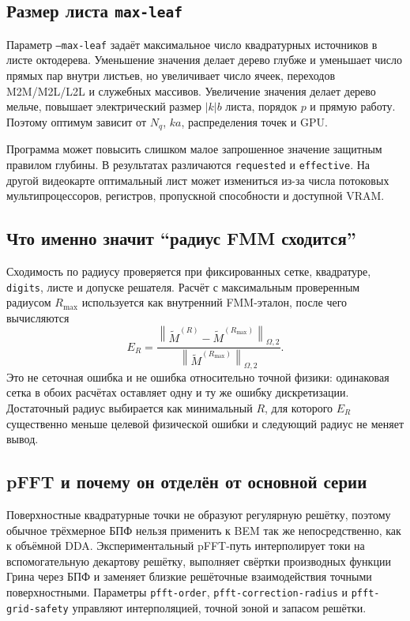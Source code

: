 \documentclass[12pt,a4paper]{article}
\newcommand{\norm}[1]{\left\lVert #1\right\rVert}
\begin{document}
\subsection{Размер листа \texttt{max-leaf}}

Параметр \texttt{--max-leaf} задаёт максимальное число квадратурных источников
в листе октодерева. Уменьшение значения делает дерево глубже и уменьшает число
прямых пар внутри листьев, но увеличивает число ячеек, переходов M2M/M2L/L2L и
служебных массивов. Увеличение значения делает дерево мельче, повышает
электрический размер $|k|b$ листа, порядок $p$ и прямую работу. Поэтому
оптимум зависит от $N_q$, $ka$, распределения точек и GPU.

Программа может повысить слишком малое запрошенное значение защитным правилом
глубины. В результатах различаются \texttt{requested} и \texttt{effective}.
На другой видеокарте оптимальный лист может измениться из-за числа потоковых
мультипроцессоров, регистров, пропускной способности и доступной VRAM.

\subsection{Что именно значит ``радиус FMM сходится''}

Сходимость по радиусу проверяется при фиксированных сетке, квадратуре,
\texttt{digits}, листе и допуске решателя. Расчёт с максимальным проверенным
радиусом $R_{\max}$ используется как внутренний FMM-эталон, после чего
вычисляются
\begin{equation}
  E_R=\frac{\norm{\widetilde M^{(R)}-
  \widetilde M^{(R_{\max})}}_{\Omega,2}}
  {\norm{\widetilde M^{(R_{\max})}}_{\Omega,2}}.
\end{equation}
Это не сеточная ошибка и не ошибка относительно точной физики: одинаковая
сетка в обоих расчётах оставляет одну и ту же ошибку дискретизации. Достаточный
радиус выбирается как минимальный $R$, для которого $E_R$ существенно меньше
целевой физической ошибки и следующий радиус не меняет вывод.

\subsection{pFFT и почему он отделён от основной серии}

Поверхностные квадратурные точки не образуют регулярную решётку, поэтому
обычное трёхмерное БПФ нельзя применить к BEM так же непосредственно, как к
объёмной DDA. Экспериментальный pFFT-путь интерполирует токи на вспомогательную
декартову решётку, выполняет свёртки производных функции Грина через БПФ и
заменяет близкие решёточные взаимодействия точными поверхностными. Параметры
\texttt{pfft-order}, \texttt{pfft-correction-radius} и
\texttt{pfft-grid-safety} управляют интерполяцией, точной зоной и запасом
решётки.
\end{document}

